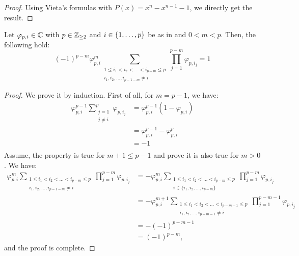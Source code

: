 \documentclass{article}
\begin{document}
    \begin{proof}
      Using Vieta's formulas with $P(x) = x^n - x^{n-1} - 1$, we directly get the result. 
    \end{proof}

    \begin{corollary} \label{cor:A-3}
      Let $\varphi_{p, i} \in \mathbb C$ with $p \in \mathbb{Z}_{\geq 2}$ and $i \in \{1, \dots, p\}$ be as in  and $0 < m < p$. 
      Then, the following hold:
      \begin{equation} 
        (-1)^{p-m} \varphi_{p, i}^{m} \sum_{\substack{1 \leq i_1 < i_2 < \dots < i_{p - m} \leq p \\ i_1, i_2, \dots, i_{p-1-m} \neq i}} 
        \prod_{j=1}^{p - m} \varphi_{p, i_j} = 1
      \end{equation}
    \end{corollary}

    \begin{proof}
      We prove it by induction. First of all, for $m = p-1$, we have:
      \begin{align} 
        \varphi_{p, i}^{p-1} \sum_{\substack{j = 1 \\ j \neq i}}^p \varphi_{p, i_j} 
        & = \varphi_{p, i}^{p-1}(1 - \varphi_{p, i}) \\
        & = \varphi_{p, i}^{p-1} - \varphi_{p, i}^{p} \\
        & = -1 \\
      \end{align}
      Assume, the property is true for $m+1 \leq p-1$ and prove it is also true for $m> 0$. We have:
      \begin{align} 
        \varphi_{p, i}^{m} \sum_{\substack{1 \leq i_1 < i_2 < \dots < i_{p - m} \leq p \\ i_1, i_2, \dots, i_{p-1-m} \neq i}} 
        \prod_{j=1}^{p - m} \varphi_{p, i_j} & = -\varphi_{p, i}^{m} \sum_{\substack{1 \leq i_1 < i_2 < \dots < i_{p - m} \leq p \\ i \in \{i_1, i_2, \dots, i_{p-m}\}}} 
        \prod_{j=1}^{p - m} \varphi_{p, i_j} \\ 
        & = -\varphi_{p, i}^{m+1} \sum_{\substack{1 \leq i_1 < i_2 < \dots < i_{p - m-1} \leq p \\ i_1, i_2, \dots, i_{p-m-1} \neq i}} 
        \prod_{j=1}^{p-m-1} \varphi_{p, i_j} \\
        & = -(-1)^{p-m-1} \\
        & = (-1)^{p-m},
      \end{align}
      and the proof is complete.
    \end{proof}
\end{document}
